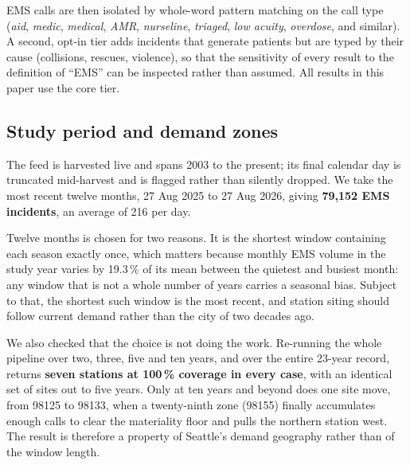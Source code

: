 \documentclass[conference]{IEEEtran}
\begin{document}
EMS calls are then isolated by whole-word pattern matching on the call type
(\textit{aid}, \textit{medic}, \textit{medical}, \textit{AMR},
\textit{nurseline}, \textit{triaged}, \textit{low acuity}, \textit{overdose},
and similar). A second, opt-in tier adds incidents that generate patients but
are typed by their cause (collisions, rescues, violence), so that the
sensitivity of every result to the definition of ``EMS'' can be inspected rather
than assumed. All results in this paper use the core tier.

\subsection{Study period and demand zones}

The feed is harvested live and spans 2003 to the present; its final calendar day
is truncated mid-harvest and is flagged rather than silently dropped. We take
the most recent twelve months, 27 Aug 2025 to 27 Aug 2026, giving
\textbf{79{,}152 EMS incidents}, an average of 216 per day.

Twelve months is chosen for two reasons. It is the shortest window containing
each season exactly once, which matters because monthly EMS volume in the study
year varies by 19.3\,\% of its mean between the quietest and busiest month: any
window that is not a whole number of years carries a seasonal bias. Subject to
that, the shortest such window is the most recent, and station siting should
follow current demand rather than the city of two decades ago.

We also checked that the choice is not doing the work. Re-running the whole
pipeline over two, three, five and ten years, and over the entire 23-year
record, returns \textbf{seven stations at 100\,\% coverage in every case}, with
an identical set of sites out to five years. Only at ten years and beyond does
one site move, from 98125 to 98133, when a twenty-ninth zone (98155) finally
accumulates enough calls to clear the materiality floor and pulls the northern
station west. The result is therefore a property of Seattle's demand geography
rather than of the window length.
\end{document}
